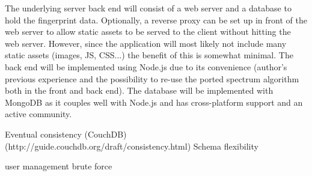 \documentclass[thesis.tex]{subfiles}
\begin{document}
The underlying server back end will consist of a web server and a database to hold the fingerprint data. Optionally, a reverse proxy can be set up in front of the web server to allow static assets to be served to the client without hitting the web server. However, since the application will most likely not include many static assets (images, JS, CSS...) the benefit of this is somewhat minimal. The back end will be implemented using Node.js due to its convenience (author's previous experience and the possibility to re-use the ported spectrum algorithm both in the front and back end). The database will be implemented with MongoDB as it couples well with Node.js and has cross-platform support and an active community.

Eventual consistency (CouchDB) (http://guide.couchdb.org/draft/consistency.html)
Schema flexibility

user management brute force
\end{document}
